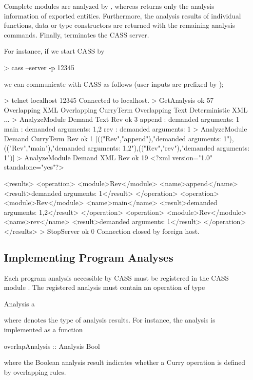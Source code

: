 Complete modules are analyzed by , whereas
 returns only the analysis information of exported
entities. Furthermore, the analysis results of individual functions,
data or type constructors are returned with the remaining analysis
commands. Finally,  terminates the CASS server.

For instance, if we start CASS by
\begin{curry}
> cass --server -p 12345
\end{curry}
we can communicate with CASS as follows (user inputs are prefixed by \ccode{>});
\begin{curry}
> telnet localhost 12345
Connected to localhost.
> GetAnalysis
ok 57
Overlapping XML
Overlapping CurryTerm
Overlapping Text
Deterministic XML
...
> AnalyzeModule Demand Text Rev
ok 3
append : demanded arguments: 1
main : demanded arguments: 1,2
rev : demanded arguments: 1
> AnalyzeModule Demand CurryTerm Rev
ok 1
[(("Rev","append"),"demanded arguments: 1"),(("Rev","main"),"demanded arguments: 1,2"),(("Rev","rev"),"demanded arguments: 1")]
> AnalyzeModule Demand XML Rev
ok 19
<?xml version="1.0" standalone="yes"?>

<results>
  <operation>
    <module>Rev</module>
    <name>append</name>
    <result>demanded arguments: 1</result>
  </operation>
  <operation>
    <module>Rev</module>
    <name>main</name>
    <result>demanded arguments: 1,2</result>
  </operation>
  <operation>
    <module>Rev</module>
    <name>rev</name>
    <result>demanded arguments: 1</result>
  </operation>
</results>
> StopServer
ok 0
Connection closed by foreign host.
\end{curry}


\subsection{Implementing Program Analyses}

Each program analysis accessible by CASS must be registered
in the CASS module . The registered analysis
must contain an operation of type
\begin{curry}
Analysis a
\end{curry}
where  denotes the type of analysis results.
For instance, the  analysis is implemented as a function
\begin{curry}
overlapAnalysis :: Analysis Bool
\end{curry}
where the Boolean analysis result indicates whether a Curry operation
is defined by overlapping rules.


